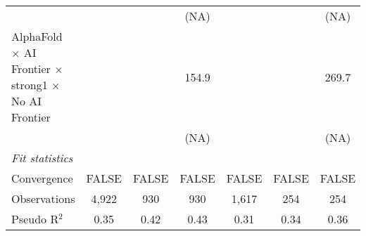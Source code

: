 \begin{tabular}{lcccccc}
                                                                              &                        &        & (NA)   &                        &        & (NA)\\   
   AlphaFold $\times$ AI Frontier $\times$ strong1 $\times$ No AI Frontier    &                        &        & 154.9  &                        &        & 269.7\\   
                                                                              &                        &        & (NA)   &                        &        & (NA)\\   
   \midrule
   \emph{Fit statistics}\\
   Convergence                                                                &FALSE                   & FALSE  & FALSE  & FALSE                  & FALSE  & FALSE\\  
   Observations                                                               & 4,922                  & 930    & 930    & 1,617                  & 254    & 254\\  
   Pseudo R$^2$                                                               & 0.35                   & 0.42   & 0.43   & 0.31                   & 0.34   & 0.36\\  
   

\end{tabular}
